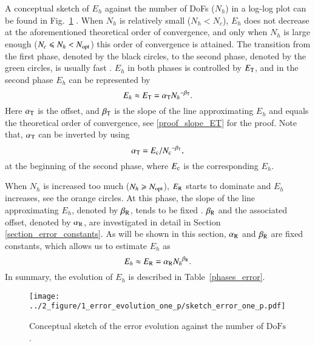 \documentclass[review,3p]{elsarticle}
\begin{document}
A conceptual sketch of $E_h$ against the number of DoFs ($N_h$) in a log-log plot can be found in Fig.~\ref{error_evolution_one_p} \cite{butcher2016numerical}.
When $N_h$ is relatively small ($N_h<N_c$), $E_h$ does not decrease at the aforementioned theoretical order of convergence, and only when $N_h$ is large enough ($N_c \leqslant N_h < N_{\rm opt}$) this order of convergence is attained.  The transition from the first phase, denoted by the black circles, to the second phase, denoted by the green circles, is usually fast \cite{butcher2016numerical}. $E_h$ in both phases is controlled by $E_{\rm T}$, and in the second phase $E_h$ can be represented by 
\begin{equation}
 E_{h} \approx E_{\rm T} = \alpha_{\rm T}{N_{h}}^{-\beta_{\rm T}}.		\label{formula_truncation_error}
\end{equation}
Here $\alpha_{\rm T}$ is the offset, and $\beta_{\rm T}$ is the slope of the line approximating $E_h$ and equals the theoretical order of convergence, see \ref{proof_slope_ET} for the proof. Note that, $\alpha_{\rm T}$ can be inverted by using 
\begin{equation}
 \alpha_{\rm T} = {E_{\rm c}}/{N_{\rm c}}^{- \beta_{\rm T}},		\label{formula_offset_truncation_error}
\end{equation}
at the beginning of the second phase, where $E_{\rm c}$ is the corresponding $E_h$.

When $N_h$ is increased too much ($N_h \geqslant N_{\rm opt}$), $E_{\rm R}$ starts to dominate and $E_h$ increases, see the orange circles. At this phase, the slope of the line approximating $E_h$, denoted by $\beta_{\rm R}$, tends to be fixed \cite{Babuska2018Roundoff,WalterFrei}. $\beta_{\rm R}$ and the associated offset, denoted by $\alpha_{\rm R}$, are investigated in detail in Section \ref{section_error_constants}. As will be shown in this section, $\alpha_{\rm R}$ and $\beta_{\rm R}$ are fixed constants, which allows us to estimate $E_h$ as
\begin{equation}
 E_{h} \approx E_{\rm R} = \alpha_{\rm R}{N_{h}}^{\beta_{\rm R}}.		\label{formula_round_off_error}
\end{equation}
In summary, the evolution of $E_h$ is described in Table~\ref{phases_error}.

\begin{figure}[!ht]
\centering
   \texttt{[image: ../2\_figure/1\_error\_evolution\_one\_p/sketch\_error\_one\_p.pdf]}
   \caption{Conceptual sketch of the error evolution against the number of $\text{DoFs}$.}
   \label{error_evolution_one_p}
\end{figure}
 
\end{document}
